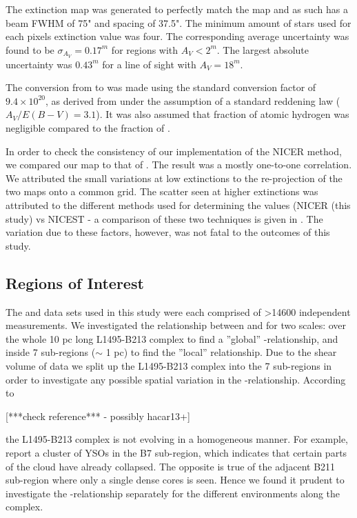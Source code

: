 \documentclass{aa}
\begin{document}
The extinction map was generated to perfectly match the \ieco map and as such has a beam FWHM of 75" and spacing of 37.5". The minimum amount of stars used for each pixels extinction value was four. The corresponding average uncertainty was found to be $\sigma_{A_V} = 0.17^m$ for regions with $A_V<2^m$. The largest absolute uncertainty was $0.43^m$ for a line of sight with $A_V=18^m$.

The conversion from \av to \htwo was made using the standard conversion factor of $9.4 \times 10^20$, as derived from \citet{bohlin78} under the assumption of a standard reddening law ($A_V/E(B-V)=3.1$). It was also assumed that fraction of atomic hydrogen was negligible compared to the fraction of \htwo.

In order to check the consistency of our implementation of the NICER method, we compared our \av map to that of \citet{lombardi10}. The result was a mostly one-to-one correlation. We attributed the small variations at low extinctions to the re-projection of the two maps onto a common grid. The scatter seen at higher extinctions was attributed to the different methods used for determining the \av values (NICER (this study) vs NICEST \citep{lombardi10} - a comparison of these two techniques is given in \citealt{lombardi09}. The variation due to these factors, however, was not fatal to the outcomes of this study.


\subsection{Regions of Interest}
The \eco and \av data sets used in this study were each comprised of >14600 independent measurements. We investigated the relationship between \av and \eco for two scales: over the whole 10 pc long L1495-B213 complex to find a ''global'' \neco-\av relationship, and inside 7 sub-regions ($\sim$ 1 pc) to find the ''local'' relationship. Due to the shear volume of data we split up the L1495-B213 complex into the 7 sub-regions in order to investigate any possible spatial variation in the \eco-\av relationship. According to \citet{???}

[***check reference*** - possibly hacar13+]

the L1495-B213 complex is not evolving in a homogeneous manner. For example, \citet{rebull10} report a cluster of YSOs in the B7 sub-region, which indicates that certain parts of the cloud have already collapsed. The opposite is true of the adjacent B211 sub-region where only a single dense cores is seen. Hence we found it prudent to investigate the \av-\eco relationship separately for the different environments along the complex.
\end{document}
